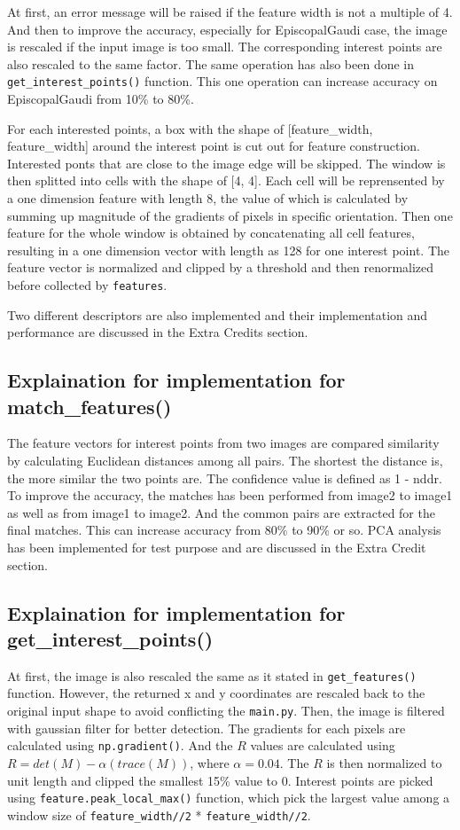 At first, an error message will be raised if the feature width is not a multiple of 4. And then to improve the accuracy, especially for EpiscopalGaudi case, the image is rescaled if the input image is too small. The corresponding interest points are also rescaled to the same factor. The same operation has also been done in \verb|get_interest_points()| function. This one operation can increase accuracy on EpiscopalGaudi from 10\% to 80\%.

For each interested points, a box with the shape of [feature\_width, feature\_width] around the interest point is cut out for feature construction. Interested ponts that are close to the image edge will be skipped. The window is then splitted into cells with the shape of [4, 4]. Each cell will be reprensented by a one dimension feature with length 8, the value of which is calculated by summing up magnitude of the gradients of pixels in specific orientation. Then one feature for the whole window is obtained by concatenating all cell features, resulting in a one dimension vector with length as 128 for one interest point. The feature vector is normalized and clipped by a threshold and then renormalized before collected by \verb|features|.

Two different descriptors are also implemented and their implementation and performance are discussed in the Extra Credits section.

\subsection*{Explaination for  implementation for match\_features()}

The feature vectors for interest points from two images are compared similarity by calculating Euclidean distances among all pairs. The shortest the distance is, the more similar the two points are. The confidence value is defined as 1 - nddr. To improve the accuracy, the matches has been performed from image2 to image1 as well as from image1 to image2. And the common pairs are extracted for the final matches. This can increase accuracy from 80\% to 90\% or so. PCA analysis has been implemented for test purpose and are discussed in the Extra Credit section.

\subsection*{Explaination for implementation for get\_interest\_points()}

At first, the image is also rescaled the same as it stated in \verb|get_features()| function. However, the returned x and y coordinates are rescaled back to the original input shape to avoid conflicting the \verb|main.py|. Then, the image is filtered with gaussian filter for better detection. The gradients for each pixels are calculated using \verb|np.gradient()|. And the $R$ values are calculated using \(R = det(M) - \alpha(trace(M))\), where \(\alpha = 0.04\). The $R$ is then normalized to unit length and clipped the smallest 15\% value to 0. Interest points are picked using \verb|feature.peak_local_max()| function, which pick the largest value among a window size of \verb|feature_width//2| * \verb|feature_width//2|.

